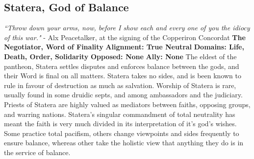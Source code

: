 \subsection{Statera, God of Balance}\label{god:statera}
\textit{“Throw down your arms, now, before I show each and every one of you the idiocy of this war."}
\break
\hspace*{\fill}- Alx Peacetalker, at the signing of the Copperiron Concordat
\break
\break
\textbf{The Negotiator, Word of Finality}\break
\hspace*{\fill}\break
\textbf{Alignment:\hspace*{\fill} True Neutral} \break
\textbf{Domains:\hspace*{\fill} Life, Death, Order, Solidarity} \break
\textbf{Opposed:\hspace*{\fill} None} \break
\textbf{Ally:\hspace*{\fill} None} \break
\hspace*{\fill}\break
The eldest of the pantheon, Statera settles disputes and enforces balance between the gods, and their Word is final on all matters. Statera takes no sides, and is been known to rule in favour of destruction as much as salvation.\newline
Worship of Statera is rare, usually found in some druidic septs, and among ambassadors and the judiciary.\newline
Priests of Statera are highly valued as mediators between faiths, opposing groups, and warring nations. Statera’s singular commandment of total neutrality has meant the faith is very much divided in its interpretation of it’s god’s wishes. Some practice total pacifism, others change viewpoints and sides frequently to ensure balance, whereas other take the holistic view that anything they do is in the service of balance.       


